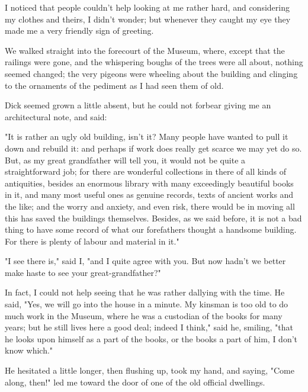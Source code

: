 I noticed that people couldn't help looking at me rather hard, and
considering my clothes and theirs, I didn't wonder; but whenever they
caught my eye they made me a very friendly sign of greeting.

We walked straight into the forecourt of the Museum, where, except that
the railings were gone, and the whispering boughs of the trees were all
about, nothing seemed changed; the very pigeons were wheeling about the
building and clinging to the ornaments of the pediment as I had seen
them of old.

Dick seemed grown a little absent, but he could not forbear giving me an
architectural note, and said:

"It is rather an ugly old building, isn't it? Many people have wanted to
pull it down and rebuild it: and perhaps if work does really get scarce
we may yet do so. But, as my great grandfather will tell you, it would
not be quite a straightforward job; for there are wonderful collections
in there of all kinds of antiquities, besides an enormous library with
many exceedingly beautiful books in it, and many most useful ones as
genuine records, texts of ancient works and the like; and the worry and
anxiety, and even risk, there would be in moving all this has saved the
buildings themselves. Besides, as we said before, it is not a bad thing
to have some record of what our forefathers thought a handsome building.
For there is plenty of labour and material in it."

"I see there is," said I, "and I quite agree with you. But now hadn't we
better make haste to see your great-grandfather?"

In fact, I could not help seeing that he was rather dallying with the
time. He said, "Yes, we will go into the house in a minute. My kinsman
is too old to do much work in the Museum, where he was a custodian of
the books for many years; but he still lives here a good deal; indeed I
think," said he, smiling, "that he looks upon himself as a part of the
books, or the books a part of him, I don't know which."

He hesitated a little longer, then flushing up, took my hand, and
saying, "Come along, then!" led me toward the door of one of the old
official dwellings.
